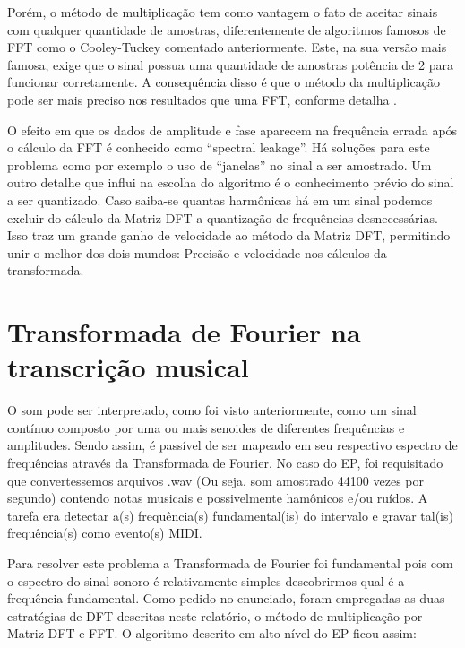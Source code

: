 \documentclass[brazil,times]{abnt}
\begin{document}
		Porém, o método de multiplicação tem como vantagem o fato de aceitar sinais com qualquer quantidade de amostras, diferentemente de algoritmos famosos de FFT como o Cooley-Tuckey comentado anteriormente. Este, na sua versão mais famosa, exige que o sinal possua uma quantidade de amostras potência de 2 para funcionar corretamente. A consequência disso é que o método da multiplicação pode ser mais preciso nos resultados que uma FFT, conforme detalha \cite{voltech:dft-vs-fft}.
		
		O efeito em que os dados de amplitude e fase aparecem na frequência errada após o cálculo da FFT é conhecido como ``spectral leakage''. Há soluções para este problema como por exemplo o uso de ``janelas'' no sinal a ser amostrado. Um outro detalhe que influi na escolha do algoritmo é o conhecimento prévio do sinal a ser quantizado. Caso saiba-se quantas harmônicas há em um sinal podemos excluir do cálculo da Matriz DFT a quantização de frequências desnecessárias. Isso traz um grande ganho de velocidade ao método da Matriz DFT, permitindo unir o melhor dos dois mundos: Precisão e velocidade nos cálculos da transformada.
	

\chapter{Transformada de Fourier na transcrição musical}
	O som pode ser interpretado, como foi visto anteriormente, como um sinal contínuo composto por uma ou mais senoides de diferentes frequências e amplitudes. Sendo assim, é passível de ser mapeado em seu respectivo espectro de frequências através da Transformada de Fourier. No caso do EP, foi requisitado que convertessemos arquivos .wav (Ou seja, som amostrado 44100 vezes por segundo) contendo notas musicais e possivelmente hamônicos e/ou ruídos. A tarefa era detectar a(s) frequência(s) fundamental(is) do intervalo e gravar tal(is) frequência(s) como evento(s) MIDI.

	Para resolver este problema a Transformada de Fourier foi fundamental pois com o espectro do sinal sonoro é relativamente simples descobrirmos qual é a frequência fundamental. Como pedido no enunciado, foram empregadas as duas estratégias de DFT descritas neste relatório, o método de multiplicação por Matriz DFT e FFT. O algoritmo descrito em alto nível do EP ficou assim:
	
\end{document}
